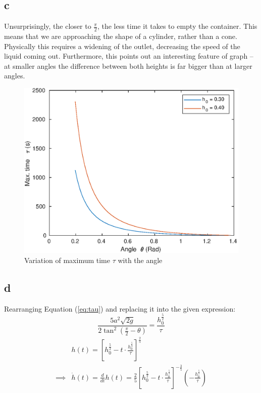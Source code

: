\subsection{c}

Unsurprisingly, the closer to $\frac{\pi}{2}$, the less time it takes to empty the container.
This means that we are approaching the shape of a cylinder, rather than a cone.
Physically this requires a widening of the outlet, decreasing the speed of the liquid coming out.
Furthermore, this points out an interesting feature of graph -- at smaller angles the difference between both heights is far bigger than at larger angles.   

\pagebreak

\begin{figure}[]
	\includegraphics[scale=0.65, center]{./eps/topic5_c.eps}
	\caption{Variation of maximum time $\tau$ with the angle}
	\label{fig:Topic5-c}
\end{figure}



\subsection{d}
Rearranging Equation (\ref{eq:tau}) and replacing it into the given expression:
\begin{equation*}
    \frac{ 5a^2 \sqrt{2g} }{ 2\tan^2\left(\frac{\pi}{2} - \theta\right)} = \frac{h_0^{\frac{5}{2}}}{\tau}
\end{equation*}
\begin{equation}
\begin{split}
    &h(t) = {\left[
        h_0^{\frac{5}{2}} - t \cdot \frac{
            h_0^{ \frac{5}{2} }
            }{\tau}    
            \right]}^\frac{2}{5} \\
    \implies &\dot{h}(t) = \frac{d}{dt}h(t) =\frac{2}{5} {\left[
        h_0^{\frac{5}{2}} - t \cdot \frac{
            h_0^{ \frac{5}{2} }
            }{\tau}    
        \right]}^{-\frac{3}{5}}
    \left(
        -\frac{ h_0^{ \frac{5}{2} }}{\tau}    
    \right)
\end{split}
\end{equation}

